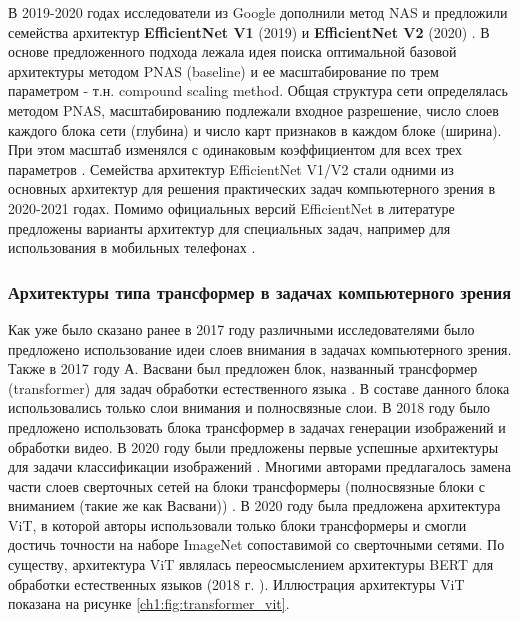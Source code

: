 \documentclass[12pt]{article}
\begin{document}
\begin{sloppypar}
В 2019-2020 годах исследователи из Google дополнили метод NAS и предложили семейства архитектур \textbf{EfficientNet V1 }(2019) \cite{tan2019efficientnet} и  \textbf{EfficientNet V2} (2020) \cite{tan2021efficientnetv2}. В основе предложенного подхода лежала идея поиска оптимальной базовой архитектуры методом PNAS (baseline)  и ее масштабирование по трем параметром - т.н. compound scaling method. Общая структура сети определялась методом PNAS, масштабированию подлежали входное разрешение, число слоев каждого блока сети (глубина) и  число карт признаков в каждом блоке (ширина). При этом масштаб изменялся с одинаковым коэффициентом для всех трех параметров \cite{tan2019efficientnet}. Семейства архитектур EfficientNet V1/V2 стали одними из основных архитектур для решения практических задач компьютерного зрения в 2020-2021 годах. Помимо официальных версий EfficientNet в литературе предложены варианты архитектур для специальных задач, например для использования в мобильных телефонах \cite{Hollemans2020NewMB}.


\subsubsection{Архитектуры типа трансформер в задачах компьютерного зрения}
Как уже было сказано ранее в 2017 году различными исследователями было предложено использование идеи слоев внимания в задачах компьютерного зрения. Также в 2017 году А. Васвани  был предложен блок, названный трансформер (transformer) для задач обработки естественного языка \cite{ vaswani2017attention}. В составе данного блока использовались только слои внимания и полносвязные слои. В 2018 году было предложено использовать блока трансформер в задачах генерации изображений и обработки видео. В 2020 году были предложены первые успешные архитектуры для задачи классификации изображений \cite{han2020survey}. Многими авторами предлагалось замена части слоев сверточных сетей на блоки трансформеры (полносвязные блоки с вниманием (такие же как Васвани)) \cite{lin2021survey}. В 2020 году была предложена архитектура ViT, в которой авторы использовали только блоки трансформеры и смогли достичь точности на наборе ImageNet сопоставимой со сверточными сетями. По существу, архитектура ViT являлась переосмыслением архитектуры BERT для обработки естественных языков (2018 г. \cite{devlin2018bert}). Иллюстрация архитектуры ViT показана на рисунке \ref{ch1:fig:transformer_vit}. 


\end{sloppypar}
\end{document}
